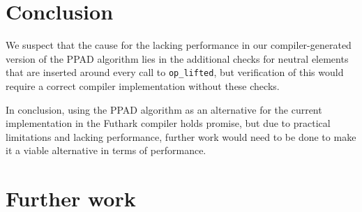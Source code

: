 \documentclass{article}
\begin{document}
\section{Conclusion}
We suspect that the cause for the lacking performance in our compiler-generated version of the PPAD
algorithm lies in the additional checks for neutral elements that are inserted around
every call to \lstinline{op_lifted}, but verification of this would require a correct
compiler implementation without these checks.

In conclusion, using the PPAD algorithm as an alternative for the current implementation in the
Futhark compiler holds promise, but due to practical limitations and lacking performance, further
work would need to be done to make it a viable alternative in terms of performance.
\printbibliography
\section{Further work}
\end{document}
